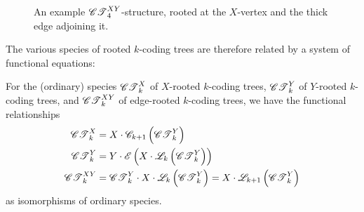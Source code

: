 \documentclass[distribution,draft]{brandiss} %
\numberwithin{section}{chapter}
\numberwithin{figure}{chapter}
\begin{document}
\begin{figure}[htb]
  \centering
  \def\kval{4}
  \caption[An example $XY$-rooted $k$-coding tree]{An example $\ctxy{\kval}$-structure, rooted at the $X$-vertex and the thick edge adjoining it.}
  \label{fig:ctxyconst}
\end{figure}

The various species of rooted $k$-coding trees are therefore related by a system of functional equations:
\begin{observation}
  \label{obs:funcdecompct}
  For the (ordinary) species $\mathscr{CT}_{k}^{X}$ of $X$-rooted $k$-coding trees, $\mathscr{CT}_{k}^{Y}$ of $Y$-rooted $k$-coding trees, and $\mathscr{CT}_{k}^{XY}$ of edge-rooted $k$-coding trees, we have the functional relationships
  \begin{subequations}
    \label{eq:ctfunc}
    \begin{align}
      \mathscr{CT}_{k}^{X} &= X \cdot \mathscr{C}_{k+1} \left( {\mathscr{CT}_{k}^{Y}} \right) \label{eq:ctxfunc} \\
      \mathscr{CT}_{k}^{Y} &= Y \cdot \mathscr{E} \left( {X \cdot \mathscr{L}_{k} \left( {\mathscr{CT}_{k}^{Y}} \right)} \right) \label{eq:ctyfunc} \\
      \mathscr{CT}_{k}^{XY} &= \mathscr{CT}_{k}^{Y} \cdot X \cdot \mathscr{L}_{k} \left( {\mathscr{CT}_{k}^{Y}} \right) = X \cdot \mathscr{L}_{k+1} \left( {\mathscr{CT}_{k}^{Y}} \right) \label{eq:ctxyfunc}
    \end{align}
  \end{subequations}
  as isomorphisms of ordinary species.
\end{observation}
\end{document}
